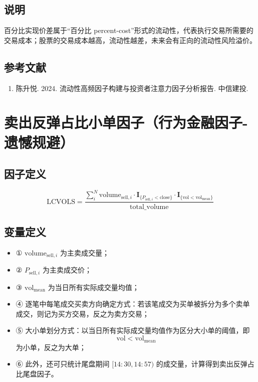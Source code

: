 \documentclass{article}
\begin{document}
\subsection{说明}
百分比实现价差属于“百分比 percent-cost”形式的流动性，代表执行交易所需要的交易成本；股票的交易成本越高，流动性越差，未来会有正向的流动性风险溢价。

\subsection{参考文献}
\begin{enumerate}
    \item 陈升悦. 2024. 流动性高频因子构建与投资者注意力因子分析报告. 中信建投.
\end{enumerate}

\section{卖出反弹占比小单因子（行为金融因子-遗憾规避）}

\subsection{因子定义}
\begin{equation}
    \mathrm{LCVOLS} = \frac{\sum_{i}^{N} \mathrm{volume}_{\mathrm{sell},i} \cdot \mathbf{I}_{\{P_{\mathrm{sell},i} < \mathrm{close}\}} \cdot \mathbf{I}_{\{\mathrm{vol} < \mathrm{vol}_{\mathrm{mean}}\}}}{\mathrm{total\_volume}}
\end{equation}

\subsection{变量定义}
\begin{itemize}
    \item ① \( \mathrm{volume}_{\mathrm{sell},i} \) 为主卖成交量；
    \item ② \( P_{\mathrm{sell},i} \) 为主卖成交价；
    \item ③ \( \mathrm{vol}_{\mathrm{mean}} \) 为当日所有实际成交量均值；
    \item ④ 逐笔中每笔成交买卖方向确定方式：若该笔成交为买单被拆分为多个卖单成交，则记为买方交易，反之为卖方交易；
    \item ⑤ 大小单划分方式：以当日所有实际成交量均值作为区分大小单的阈值，即
        \begin{equation*}
            \mathrm{vol} < \mathrm{vol}_{\mathrm{mean}}
        \end{equation*}
        为小单，反之为大单；
    \item ⑥ 此外，还可只统计尾盘期间 \([14:30,14:57)\) 的成交量，计算得到卖出反弹占比尾盘因子。
\end{itemize}
\end{document}
